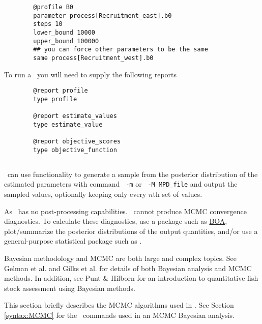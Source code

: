 {\small{\begin{verbatim}
		@profile B0
		parameter process[Recruitment_east].b0
		steps 10
		lower_bound 10000
		upper_bound 100000
		## you can force other parameters to be the same
		same process[Recruitment_west].b0
		\end{verbatim}}}
	
To run a \CNAME\ you will need to supply the following reports

{\small{\begin{verbatim}
		@report profile
		type profile
		
		@report estimate_values
		type estimate_value
		
		@report objective_scores
		type objective_function
\end{verbatim}}}
 


\subsection{}\label{sec:MCMC}\label{sec:MCMC-RandomWalkMetropolisHastings}

\CNAME\ can use  functionality to generate a sample from the posterior distribution of the estimated parameters with command \texttt{\cname\ -m} or \texttt{\cname\ -M MPD\_file} and output the sampled values, optionally keeping only every $n$th set of values.

As \CNAME\ has no post-processing capabilities. \CNAME\ cannot produce MCMC convergence diagnostics. To calculate these diagnostics, use a package such as \href{http://www.public-health.uiowa.edu/boa}{BOA}, plot/summarize the posterior distributions of the output quantities, and/or use a general-purpose statistical package such as \href{http://www.r-project.org}{\R}.

Bayesian methodology and MCMC are both large and complex topics. See Gelman et al. \citeyearpar{823} and Gilks et al. \citeyearpar{143} for details of both Bayesian analysis and MCMC methods. In addition, see Punt \& Hilborn \citeyearpar{828} for an introduction to quantitative fish stock assessment using Bayesian methods.

This section briefly describes the MCMC algorithms used in \CNAME. See Section \ref{syntax:MCMC} for the \CNAME\ commands used in an MCMC Bayesian analysis.

